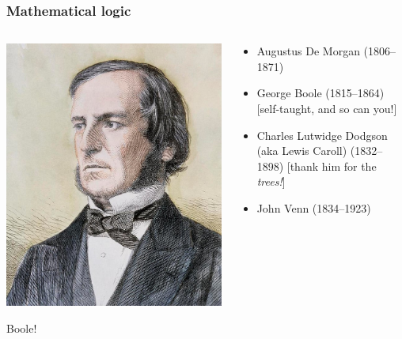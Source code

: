 \begin{frame}
  \frametitle{Mathematical logic}

  \begin{columns}
    \begin{column}{.5\textwidth}
    \includegraphics[height=.8\textheight]{../assets/boole}
    
    Boole! 
    \end{column}
    \begin{column}{.5\textwidth}
      \begin{itemize}[<+->]
        \item Augustus De Morgan (1806--1871)
        \item George Boole (1815--1864) [self-taught, and so can you!]
        \item Charles Lutwidge Dodgson (aka Lewis Caroll) (1832--1898) [thank him for the \emph{trees!}]
        \item John Venn (1834--1923)
      \end{itemize}
    \end{column}
  \end{columns}
\end{frame}

